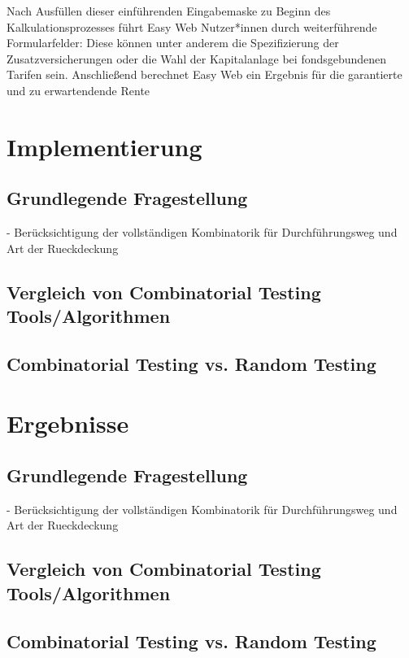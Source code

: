 Nach Ausfüllen dieser einführenden Eingabemaske zu Beginn des Kalkulationsprozesses führt Easy Web Nutzer*innen durch weiterführende Formularfelder: Diese können unter anderem die Spezifizierung der Zusatzversicherungen oder die Wahl der Kapitalanlage bei fondsgebundenen Tarifen sein. Anschließend berechnet Easy Web ein Ergebnis für die garantierte und zu erwartendende Rente

\section{Implementierung}



\subsection{Grundlegende Fragestellung}

- Berücksichtigung der vollständigen Kombinatorik für Durchführungsweg und Art der Rueckdeckung

\subsection{Vergleich von Combinatorial Testing Tools/Algorithmen}

\subsection{Combinatorial Testing vs. Random Testing}

\section{Ergebnisse}

\subsection{Grundlegende Fragestellung}

- Berücksichtigung der vollständigen Kombinatorik für Durchführungsweg und Art der Rueckdeckung

\subsection{Vergleich von Combinatorial Testing Tools/Algorithmen}

\subsection{Combinatorial Testing vs. Random Testing}
